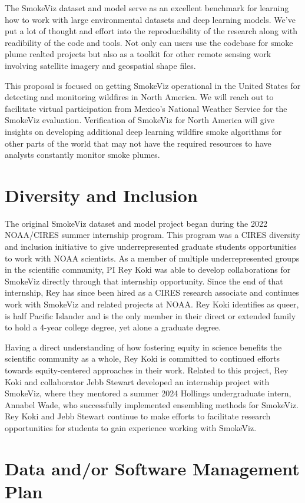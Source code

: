The SmokeViz dataset and model serve as an excellent benchmark for learning how to work with large environmental datasets and deep learning models. We've put a lot of thought and effort into the reproducibility of the research along with readibility of the code and tools. Not only can users use the codebase for smoke plume realted projects but also as a toolkit for other remote sensing work involving satellite imagery and geospatial shape files. 

This proposal is focused on getting SmokeViz operational in the United States for detecting and monitoring wildfires in North America. We will reach out to facilitate virtual participation from Mexico's National Weather Service for the SmokeViz evaluation. Verification of SmokeViz for North America will give insights on developing additional deep learning wildfire smoke algorithms for other parts of the world that may not have the required resources to have analysts constantly monitor smoke plumes.


\section{Diversity and Inclusion}

The original SmokeViz dataset and model project began during the 2022 NOAA/CIRES summer internship program. This program was a CIRES diversity and inclusion initiative to give underrepresented graduate students opportunities to work with NOAA scientists. As a member of multiple underrepresented groups in the scientific community, PI Rey Koki was able to develop collaborations for SmokeViz directly through that internship opportunity. Since the end of that internship, Rey has since been hired as a CIRES research associate and continues work with SmokeViz and related projects at NOAA. Rey Koki identifies as queer, is half Pacific Islander and is the only member in their direct or extended family to hold a 4-year college degree, yet alone a graduate degree. 
 
Having a direct understanding of how fostering equity in science benefits the scientific community as a whole, Rey Koki is committed to continued efforts towards equity-centered approaches in their work. Related to this project, Rey Koki and collaborator Jebb Stewart developed an internship project with SmokeViz, where they mentored a summer 2024 Hollings undergraduate intern, Annabel Wade, who successfully implemented ensembling methods for SmokeViz. Rey Koki and Jebb Stewart continue to make efforts to facilitate research opportunities for students to gain experience working with SmokeViz.

\section{Data and/or Software Management Plan}


